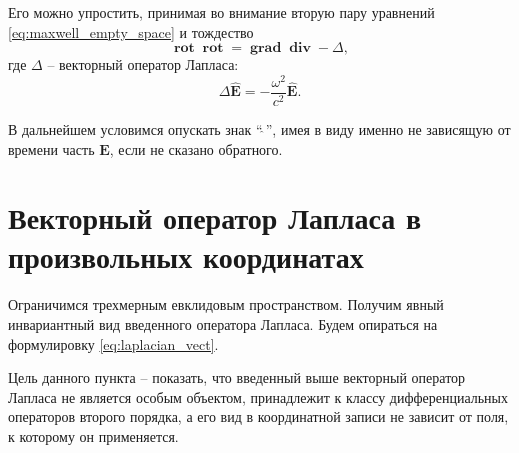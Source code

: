 \documentclass[12pt,a4paper]{article}
\DeclareMathOperator{\Rot}{\mathbf{rot}}
\DeclareMathOperator{\Grad}{\mathbf{grad}}
\DeclareMathOperator{\Div}{\mathbf{div}}
\newcommand{\V}[1]{\mathbf{#1}}
\begin{document}
        Его можно упростить, принимая во внимание вторую пару уравнений \autoref{eq:maxwell_empty_space} и тождество
        \begin{equation}\label{eq:laplacian_vect}
            \Rot\Rot = \Grad\Div - \Delta,
        \end{equation}
        где $\Delta$ -- векторный оператор Лапласа:
        \begin{equation}
            \Delta\V{\hat{E}} = - \frac{\omega^2}{c^2} \V{\hat{E}}.
        \end{equation}

        В дальнейшем условимся опускать знак \enquote{$\hat{\ }$}, имея в виду именно не зависящую от времени часть $\V{E}$, если не сказано обратного.


    \section{Векторный оператор Лапласа в произвольных координатах}

        Ограничимся трехмерным евклидовым пространством. Получим явный инвариантный вид введенного оператора Лапласа. Будем опираться на формулировку \autoref{eq:laplacian_vect}.

        Цель данного пункта -- показать, что введенный выше векторный оператор Лапласа не является особым объектом, принадлежит к классу дифференциальных операторов второго порядка, а его вид в координатной записи не зависит от поля, к которому он применяется.
\end{document}
